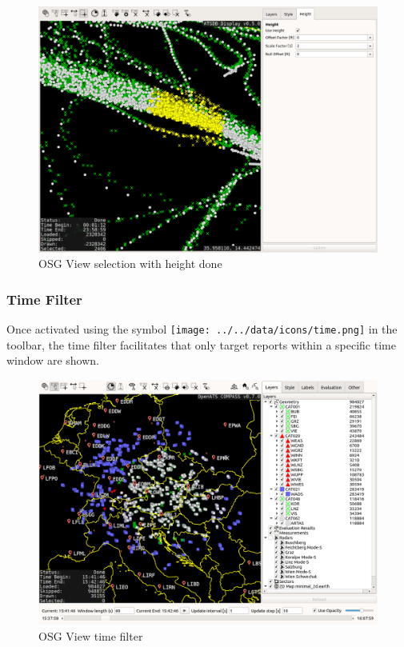 \begin{figure}[H]
    \hspace*{-2.5cm}
    \includegraphics[width=19cm,frame]{figures/osgview_select3d_2.png}
  \caption{OSG View selection with height done}
\end{figure}


\subsubsection{Time Filter}

Once activated using the symbol \texttt{[image: ../../data/icons/time.png]} in the toolbar, the time filter facilitates that only target reports within a specific time window are shown.


\begin{figure}[H]
    \hspace*{-2.5cm}
    \includegraphics[width=19cm,frame]{figures/osgview_time_filter.png}
  \caption{OSG View time filter}
  \label{fig:osgview_time_filter}
\end{figure}

